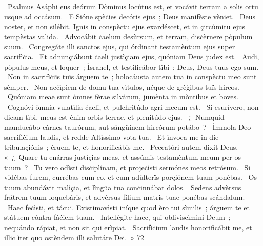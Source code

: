 {~Psalmus Asáphi}
{%
eus deórum Dòminus locútus est, et vocávit terram a solis ortu usque ad occásum.
~E Sióne spèċies decóris ejus~; Deus manifèste vèniet.
~Deus noster, et non silébit. Ignis in conspèctu ejus exardéscet, et in çircùmitu ejus tempèstas valida.
~Advocábit ċaelum desùrsum, et terram, disċèrnere pòpulum suum.
~Congregáte illi sanctos ejus, qui órdinant testamèntum ejus super sacrifìċia.
~Et adnunçiábunt ċaeli justìçiam ejus, quóniam Deus judex est.
~Audi, pòpulus meus, et loquer~; Ìsrahel, et testificábor tìbi~; Deus, Deus tuus ego sum.
~Non in sacrifìċiïs tuïs árguem te~; holocáusta autem tua in conspèctu meo sunt sèmper.
~Non acċìpiem de domu tua vìtulos, néque de grèġibus tuïs hircos.
~Quóniam meae sunt òmnes fèrae silvárum, jumènta in mòntibus et boves.
~Cognóvi òmnia vulatìlia ċaeli, et pulchritúdo agri mecum est.
~Si esurívero, non dicam tìbi, meus est ènim orbis terrae, et plenitúdo ejus.
~¿~Numquid manducábo càrnes taurórum, aut sángüinem hircórum potábo~?
~Ìmmola Deo sacrifìċium laudis, et redde Altìssimo vota tua.
~Et ìnvoca me in die tribulaçiónis~; éruem te, et honorificábis me.
~Peccatóri autem dixit Deus, «~¿~Quare tu enárras justìçias meas, et assúmis testamèntum meum per os tuum~?
~Tu vero odìsti disċiplínam, et projeċìsti sermónes meos retrósum.
~Si vidébas furem, currébas cum eo, et cum adùlterïs porçiónem tuam ponébas.
~Os tuum abundávit malìçia, et lìngüa tua conċinnábat dolos.
~Sedens advèrsus frátrem tuum loquebáris, et advèrsus fílium matris tuae ponébas scándalum.
~Haec feċìsti, et tácui. Existimavìsti iníque quod èro tui sìmilis~; árguem te et státuem còntra fàċiem tuam.
~Intellègite haec, qui obliviscìmini Deum~; nequándo rápiat, et non sit qui erìpiat.
~Sacrifìċium laudis honorificábit me, et illic ìter quo ostèndem illi salutáre Dei.~»
}
{7}{2}

